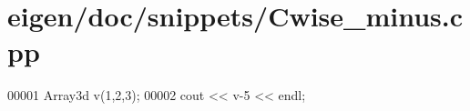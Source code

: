 \hypertarget{eigen_2doc_2snippets_2_cwise__minus_8cpp_source}{}\section{eigen/doc/snippets/\+Cwise\+\_\+minus.cpp}
\label{eigen_2doc_2snippets_2_cwise__minus_8cpp_source}

\begin{DoxyCode}
00001 Array3d v(1,2,3);
00002 cout << v-5 << endl;
\end{DoxyCode}
